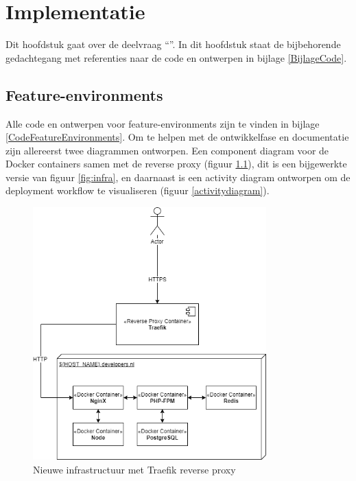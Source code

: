 \chapter{Implementatie}

\label{Chapter6}

Dit hoofdstuk gaat over de deelvraag \enquote{\deelimplementatie}. In dit hoofdstuk staat de bijbehorende gedachtegang met referenties naar de code en ontwerpen in bijlage \ref{BijlageCode}.

\section{Feature-environments} \label{implementatieFeatureEnvs}

Alle code en ontwerpen voor feature-environments zijn te vinden in bijlage \ref{CodeFeatureEnvironments}. Om te helpen met de ontwikkelfase en documentatie zijn allereerst twee diagrammen ontworpen. Een component diagram voor de Docker containers samen met de reverse proxy (figuur \ref{traefikinfrastructure}), dit is een bijgewerkte versie van figuur \ref{fig:infra}, en daarnaast is een activity diagram ontworpen om de deployment workflow te visualiseren (figuur \ref{activitydiagram}).

\begin{figure}[H]
	\centering
	\includegraphics[width=9cm]{Figures/Traefik}
	\decoRule
	\caption[Traefik Infrastructure]{Nieuwe infrastructuur met Traefik reverse proxy}
	\label{traefikinfrastructure}
\end{figure}

